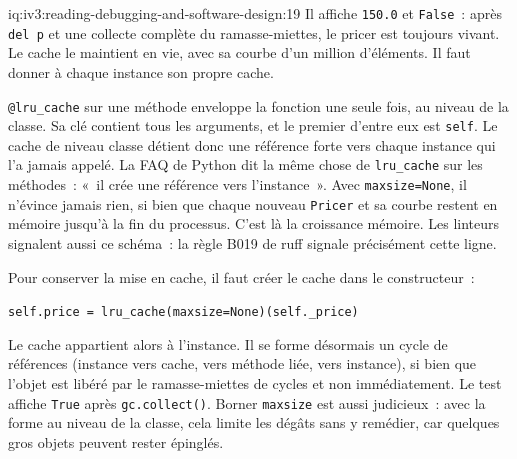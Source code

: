 \begin{solution}{iq:iv3:reading-debugging-and-software-design:19}
Il affiche \texttt{150.0} et \texttt{False}~: après \texttt{del p} et une collecte complète du ramasse-miettes, le pricer est toujours vivant. Le cache le maintient en vie, avec sa courbe d'un million d'éléments. Il faut donner à chaque instance son propre cache.

\texttt{@lru\_cache} sur une méthode enveloppe la fonction une seule fois, au niveau de la classe. Sa clé contient tous les arguments, et le premier d'entre eux est \texttt{self}. Le cache de niveau classe détient donc une référence forte vers chaque instance qui l'a jamais appelé. La FAQ de Python dit la même chose de \texttt{lru\_cache} sur les méthodes~: «~il crée une référence vers l'instance~». Avec \texttt{maxsize=None}, il n'évince jamais rien, si bien que chaque nouveau \texttt{Pricer} et sa courbe restent en mémoire jusqu'à la fin du processus. C'est là la croissance mémoire. Les linteurs signalent aussi ce schéma~: la règle B019 de ruff signale précisément cette ligne.

Pour conserver la mise en cache, il faut créer le cache dans le constructeur~:

\texttt{self.price = lru\_cache(maxsize=None)(self.\_price)}

Le cache appartient alors à l'instance. Il se forme désormais un cycle de références (instance vers cache, vers méthode liée, vers instance), si bien que l'objet est libéré par le ramasse-miettes de cycles et non immédiatement. Le test affiche \texttt{True} après \texttt{gc.collect()}. Borner \texttt{maxsize} est aussi judicieux~: avec la forme au niveau de la classe, cela limite les dégâts sans y remédier, car quelques gros objets peuvent rester épinglés.


\end{solution}

